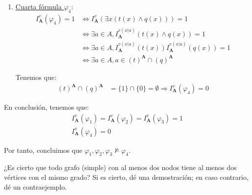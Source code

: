 \documentclass[12pt]{article}
\renewcommand{\bf}[1]{\mathbf{#1}}
\begin{document}
\begin{ejercicio}
\begin{enumerate}
        \item \ul{Cuarta fórmula $\varphi_4$}:
        \begin{align*}
            I_{\bf{A}}^v(\varphi_4) = 1 &\Longleftrightarrow
            I_{\bf{A}}^v(\exists x\left( t(x) \land q(x) \right)) = 1\\
            & \Longleftrightarrow \exists a\in A, I_{\bf{A}}^{v(x|a)}\left( t(x) \land q(x) \right) = 1\\
            & \Longleftrightarrow \exists a\in A, I_{\bf{A}}^{v(x|a)}\left( t(x) \right)I_{\bf{A}}^{v(x|a)}\left( q(x) \right) = 1\\
            & \Longleftrightarrow \exists a\in A, a\in (t)^{\bf{A}}\cap (q)^{\bf{A}}
        \end{align*}
    
        Tenemos que:
        \begin{align*}
            (t)^{\bf{A}}\cap (q)^{\bf{A}} &= \{1\}\cap \{0\} = \emptyset
            \Longrightarrow
            I_{\bf{A}}^v(\varphi_4) = 0
        \end{align*}
    \end{enumerate}
    
    En conclusión, tenemos que:   
    \begin{gather*}
        I_{\bf{A}}^v(\varphi_1) = I_{\bf{A}}^v(\varphi_2) = I_{\bf{A}}^v(\varphi_3) = 1\\
        I_{\bf{A}}^v(\varphi_4) = 0
    \end{gather*}

    Por tanto, concluimos que $\varphi_1, \varphi_2, \varphi_3 \not\models \varphi_4$.
\end{ejercicio}

\begin{ejercicio}
    ¿Es cierto que todo grafo (simple) con al menos dos nodos
    tiene al menos dos vértices con el mismo grado? Si es cierto,
    dé una demostración; en caso contrario, dé un contraejemplo.

\end{ejercicio}

    
\end{document}
